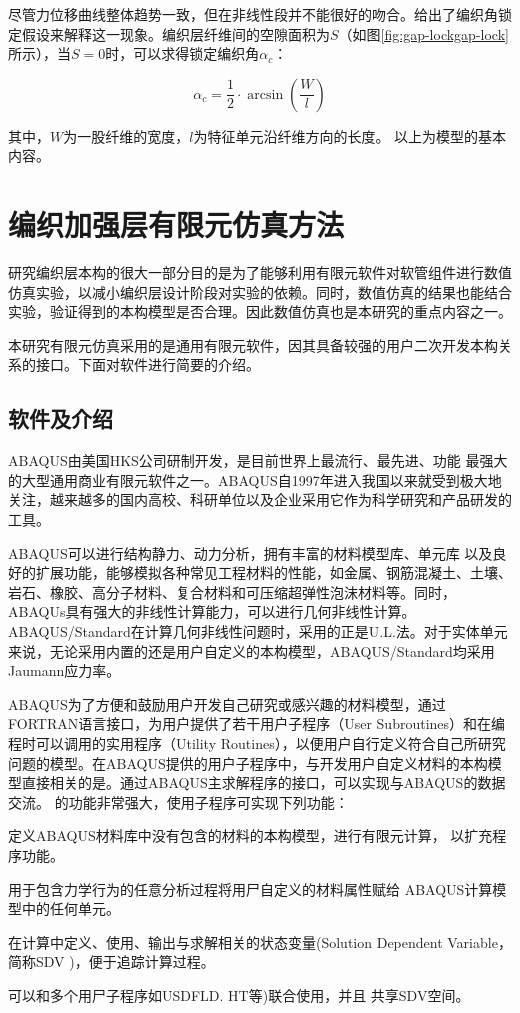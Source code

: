 尽管力位移曲线整体趋势一致，但在非线性段并不能很好的吻合。\ha 给出了编织角锁定假设来解释这一现象。编织层纤维间的空隙面积为$ S $（如图\ref{fig:gap-lockgap-lock}所示），当$ S = 0 $时，可以求得锁定编织角$ \alpha_c $：

\begin{equation}
{\alpha _c} = \frac{1}{2} \cdot \arcsin \left( {\frac{W}{l}} \right)
\end{equation}

其中，$ W $为一股纤维的宽度，$ l  $为特征单元沿纤维方向的长度。
以上为\ha 模型的基本内容。





\section{编织加强层有限元仿真方法}

研究编织层本构的很大一部分目的是为了能够利用有限元软件对软管组件进行数值仿真实验，以减小编织层设计阶段对实验的依赖。同时，数值仿真的结果也能结合实验，验证得到的本构模型是否合理。因此数值仿真也是本研究的重点内容之一。

本研究有限元仿真采用的是通用有限元软件\aba ，因其具备较强的用户二次开发本构关系的接口。下面对\aba 软件进行简要的介绍。


\subsection{\aba 软件及\uma 介绍}
    ABAQUS由美国HKS公司研制开发，是目前世界上最流行、最先进、功能
最强大的大型通用商业有限元软件之一。ABAQUS自1997年进入我国以来就受到极大地关注，越来越多的国内高校、科研单位以及企业采用它作为科学研究和产品研发的工具。


ABAQUS可以进行结构静力、动力分析，拥有丰富的材料模型库、单元库
以及良好的扩展功能，能够模拟各种常见工程材料的性能，如金属、钢筋混凝土、土壤、岩石、橡胶、高分子材料、复合材料和可压缩超弹性泡沫材料等。同时，ABAQUs具有强大的非线性计算能力，可以进行几何非线性计算。ABAQUS/Standard在计算几何非线性问题时，采用的正是U.L.法。对于实体单元来说，无论采用内置的还是用户自定义的本构模型，ABAQUS/Standard均采用Jaumann应力率。


    ABAQUS为了方便和鼓励用户开发自己研究或感兴趣的材料模型，通过
FORTRAN语言接口，为用户提供了若干用户子程序（User Subroutines）和在编程时可以调用的实用程序（Utility Routines），以便用户自行定义符合自己所研究问题的模型。在ABAQUS提供的用户子程序中，与开发用户自定义材料的本构模型直接相关的是\uma 。通过ABAQUS主求解程序的接口，\uma 可以实现与ABAQUS的数据交流。
    \uma 的功能非常强大，使用\uma 子程序可实现下列功能\cite{lijinzhu2011}：
 \begin{compactenum}
\item 定义ABAQUS材料库中没有包含的材料的本构模型，进行有限元计算，
 	    以扩充程序功能。
\item 用于包含力学行为的任意分析过程将用尸自定义的材料属性赋给
 	    ABAQUS计算模型中的任何单元。
\item 在计算中定义、使用、输出与求解相关的状态变量(Solution Dependent
 	    Variable，简称SDV )，便于追踪计算过程。
\item 可以和多个用尸子程序如USDFLD. \uma HT等)联合使用，并且
 	    共享SDV空间。
 \end{compactenum}

